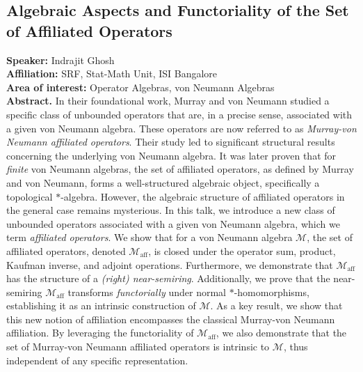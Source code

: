 %
%
\subsection*{Algebraic Aspects and Functoriality of the Set of Affiliated Operators}
\noindent
\textbf{Speaker:} Indrajit Ghosh \\ %
\textbf{Affiliation:} SRF, Stat-Math Unit, ISI Bangalore \\ %
\textbf{Area of interest:} Operator Algebras, von Neumann Algebras \\

\noindent\textbf{Abstract.}
In their foundational work, Murray and von Neumann studied a specific class of unbounded operators that are, in a precise sense, associated with a given von Neumann algebra. These operators are now referred to as \emph{Murray-von Neumann affiliated operators}. Their study led to significant structural results concerning the underlying von Neumann algebra. It was later proven that for \emph{finite} von Neumann algebras, the set of affiliated operators, as defined by Murray and von Neumann, forms a well-structured algebraic object, specifically a topological $*$-algebra. However, the algebraic structure of affiliated operators in the general case remains mysterious. In this talk, we introduce a new class of unbounded operators associated with a given von Neumann algebra, which we term \textit{affiliated operators}. We show that for a von Neumann algebra $\mathscr{M}$, the set of affiliated operators, denoted $\mathscr{M}_{\textrm{aff}}$, is closed under the operator sum, product, Kaufman inverse, and adjoint operations. Furthermore, we demonstrate that $\mathscr{M}_{\textrm{aff}}$ has the structure of a \textit{(right) near-semiring}. Additionally, we prove that the near-semiring $\mathscr{M}_{\textrm{aff}}$ transforms \textit{functorially} under normal $*$-homomorphisms, establishing it as an intrinsic construction of $\mathscr{M}$. As a key result, we show that this new notion of affiliation encompasses the classical Murray-von Neumann affiliation. By leveraging the functoriality of $\mathscr{M}_{\textrm{aff}}$, we also demonstrate that the set of Murray-von Neumann affiliated operators is intrinsic to $\mathscr{M}$, thus independent of any specific representation.



